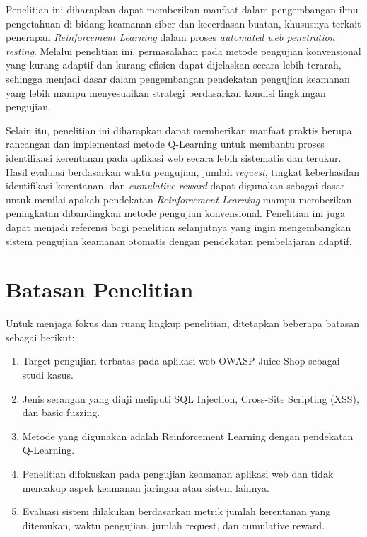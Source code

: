 Penelitian ini diharapkan dapat memberikan manfaat dalam pengembangan ilmu pengetahuan di bidang keamanan siber dan kecerdasan buatan, khususnya terkait penerapan \textit{Reinforcement Learning} dalam proses \textit{automated web penetration testing}. Melalui penelitian ini, permasalahan pada metode pengujian konvensional yang kurang adaptif dan kurang efisien dapat dijelaskan secara lebih terarah, sehingga menjadi dasar dalam pengembangan pendekatan pengujian keamanan yang lebih mampu menyesuaikan strategi berdasarkan kondisi lingkungan pengujian.

Selain itu, penelitian ini diharapkan dapat memberikan manfaat praktis berupa rancangan dan implementasi metode Q-Learning untuk membantu proses identifikasi kerentanan pada aplikasi web secara lebih sistematis dan terukur. Hasil evaluasi berdasarkan waktu pengujian, jumlah \textit{request}, tingkat keberhasilan identifikasi kerentanan, dan \textit{cumulative reward} dapat digunakan sebagai dasar untuk menilai apakah pendekatan \textit{Reinforcement Learning} mampu memberikan peningkatan dibandingkan metode pengujian konvensional. Penelitian ini juga dapat menjadi referensi bagi penelitian selanjutnya yang ingin mengembangkan sistem pengujian keamanan otomatis dengan pendekatan pembelajaran adaptif.


\section{Batasan Penelitian}

Untuk menjaga fokus dan ruang lingkup penelitian, ditetapkan beberapa batasan sebagai berikut:

\begin{enumerate}
    \item Target pengujian terbatas pada aplikasi web OWASP Juice Shop sebagai studi kasus.
    \item Jenis serangan yang diuji meliputi SQL Injection, Cross-Site Scripting (XSS), dan basic fuzzing.
    \item Metode yang digunakan adalah Reinforcement Learning dengan pendekatan Q-Learning.
    \item Penelitian difokuskan pada pengujian keamanan aplikasi web dan tidak mencakup aspek keamanan jaringan atau sistem lainnya.
    \item Evaluasi sistem dilakukan berdasarkan metrik jumlah kerentanan yang ditemukan, waktu pengujian, jumlah request, dan cumulative reward. 
\end{enumerate}

